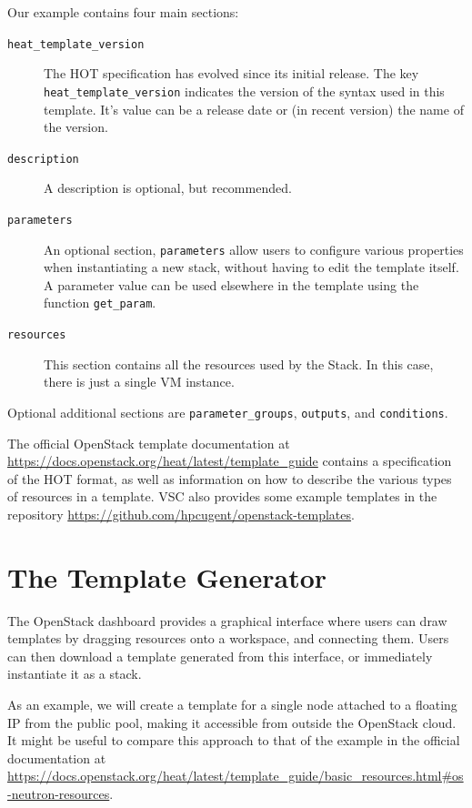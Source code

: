 Our example contains four main sections:
\begin{description}
\item[\texttt{heat\_template\_version}] The \textsc{HOT} specification
  has evolved since its initial release.  The key
  \lstinline{heat_template_version} indicates the version of the
  syntax used in this template.  It's value can be a release date or
  (in recent version) the name of the version.
\item[\texttt{description}] A description is optional, but
  recommended.
\item[\texttt{parameters}] An optional section, \lstinline{parameters}
  allow users to configure various properties when instantiating a new
  stack, without having to edit the template itself.  A parameter
  value can be used elsewhere in the template using the function
  \lstinline{get_param}.
\item[\texttt{resources}] This section contains all the resources used
  by the Stack.  In this case, there is just a single VM instance.
\end{description}
Optional additional sections are \lstinline{parameter_groups},
\lstinline{outputs}, and \lstinline{conditions}.

The official OpenStack template documentation at
\url{https://docs.openstack.org/heat/latest/template_guide} contains a
specification of the \textsc{HOT} format, as well as information on
how to describe the various types of resources in a template.
\textsc{VSC} also provides some example templates in the repository
\url{https://github.com/hpcugent/openstack-templates}.

\section{The Template Generator}
The OpenStack dashboard provides a graphical interface where users can
draw templates by dragging resources onto a workspace, and connecting
them.  Users can then download a template generated from this
interface, or immediately instantiate it as a stack.

As an example, we will create a template for a single node attached to
a floating IP from the public pool, making it accessible from outside
the OpenStack cloud.  It might be useful to compare this approach to
that of the example in the official documentation at
\url{https://docs.openstack.org/heat/latest/template_guide/basic_resources.html#os-neutron-resources}.

